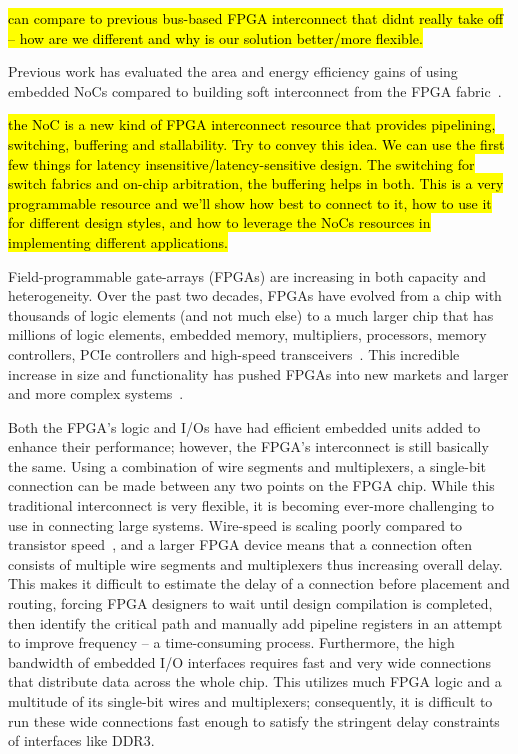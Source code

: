 {\hl{can compare to previous bus-based FPGA interconnect that didnt really take off -- how are we different and why is our solution better/more flexible.}

Previous work has evaluated the area and energy efficiency gains of using embedded NoCs compared to building soft interconnect from the FPGA fabric~\cite{fpl,fpt,trets,micro}.

\hl{the NoC is a new kind of FPGA interconnect resource that provides pipelining, switching, buffering and stallability. Try to convey this idea. We can use the first few things for latency insensitive/latency-sensitive design. The switching for switch fabrics and on-chip arbitration, the buffering helps in both. This is a very programmable resource and we'll show how best to connect to it, how to use it for different design styles, and how to leverage the NoCs resources in implementing different applications.}

}


Field-programmable gate-arrays (FPGAs) are increasing in both capacity and heterogeneity. 
Over the past two decades, FPGAs have evolved from a chip with thousands of logic elements (and not much else) to a much larger chip that has millions of logic elements, embedded memory, multipliers, processors, memory controllers, PCIe controllers and high-speed transceivers~\cite{xilinx_datasheets}.
This incredible increase in size and functionality has pushed FPGAs into new markets and larger and more complex systems~\cite{Putnam2014}.

Both the FPGA's logic and I/Os have had efficient embedded units added to enhance their performance; however, the FPGA's interconnect is still basically the same.
Using a combination of wire segments and multiplexers, a single-bit connection can be made between any two points on the FPGA chip.
While this traditional interconnect is very flexible, it is becoming ever-more challenging to use in connecting large systems.
Wire-speed is scaling poorly compared to transistor speed~\cite{Ho2001}, and a larger FPGA device means that a connection often consists of multiple wire segments and multiplexers thus increasing overall delay.
This makes it difficult to estimate the delay of a connection before placement and routing, forcing FPGA designers to wait until design compilation is completed, then identify the critical path and manually add pipeline registers in an attempt to improve frequency -- a time-consuming process.
Furthermore, the high bandwidth of embedded I/O interfaces requires fast and very wide connections that distribute data across the whole chip.
This utilizes much FPGA logic and a multitude of its single-bit wires and multiplexers; consequently, it is difficult to run these wide connections fast enough to satisfy the stringent delay constraints of interfaces like DDR3.


